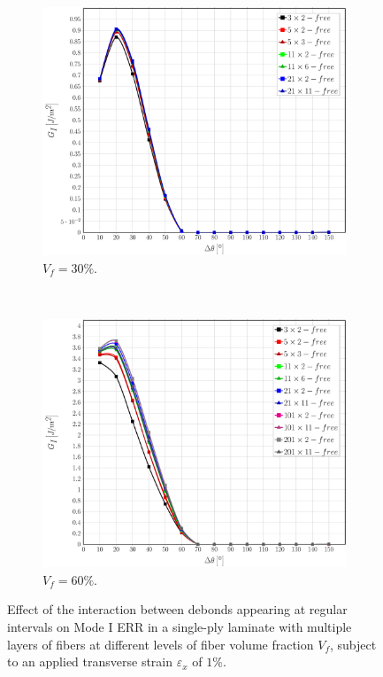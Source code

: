 \documentclass[review]{elsarticle}
\begin{document}
\begin{figure}[!h]
\centering
    \begin{subfigure}[b]{0.475\textwidth}
        \includegraphics[width=\textwidth]{sideabovefibers-vf30-GI.pdf}
        \caption{$V_{f}=30\%$.}\label{subfig:sideabovefiber30MI}
    \end{subfigure} ~
    \begin{subfigure}[b]{0.475\textwidth}
        \includegraphics[width=\textwidth]{sideabovefibers-vf60-GI.pdf}
        \caption{$V_{f}=60\%$.}\label{subfig:sideabovefiber60MI}
    \end{subfigure}

\caption{Effect of the interaction between debonds appearing at regular intervals on Mode I ERR in a single-ply laminate with multiple layers of fibers at different levels of fiber volume fraction $V_{f}$, subject to an applied transverse strain $\varepsilon_{x}$ of $1\%$.}\label{fig:sideabovefibersMI}
\end{figure}
\end{document}

